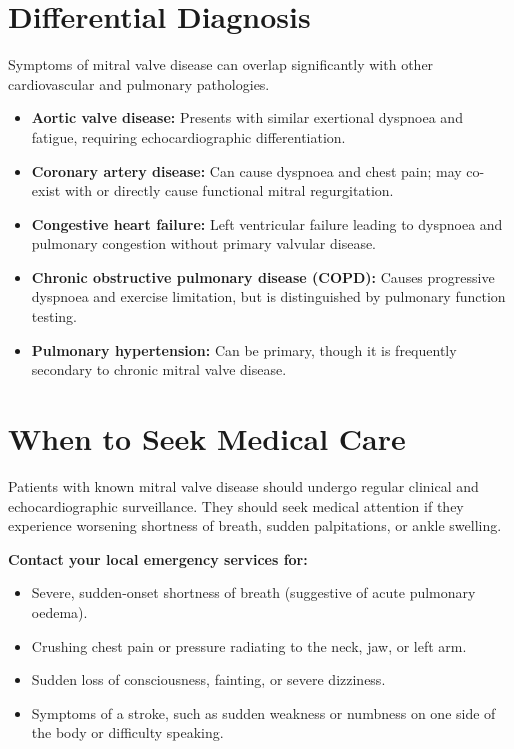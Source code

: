 \section*{Differential Diagnosis}
Symptoms of mitral valve disease can overlap significantly with other cardiovascular and pulmonary pathologies.
\begin{itemize}
    \item \textbf{Aortic valve disease:} Presents with similar exertional dyspnoea and fatigue, requiring echocardiographic differentiation.
    \item \textbf{Coronary artery disease:} Can cause dyspnoea and chest pain; may co-exist with or directly cause functional mitral regurgitation.
    \item \textbf{Congestive heart failure:} Left ventricular failure leading to dyspnoea and pulmonary congestion without primary valvular disease.
    \item \textbf{Chronic obstructive pulmonary disease (COPD):} Causes progressive dyspnoea and exercise limitation, but is distinguished by pulmonary function testing.
    \item \textbf{Pulmonary hypertension:} Can be primary, though it is frequently secondary to chronic mitral valve disease.
\end{itemize}

\section*{When to Seek Medical Care}
Patients with known mitral valve disease should undergo regular clinical and echocardiographic surveillance. They should seek medical attention if they experience worsening shortness of breath, sudden palpitations, or ankle swelling.

\textbf{Contact your local emergency services for:}
\begin{itemize}
    \item Severe, sudden-onset shortness of breath (suggestive of acute pulmonary oedema).
    \item Crushing chest pain or pressure radiating to the neck, jaw, or left arm.
    \item Sudden loss of consciousness, fainting, or severe dizziness.
    \item Symptoms of a stroke, such as sudden weakness or numbness on one side of the body or difficulty speaking.
\end{itemize}

